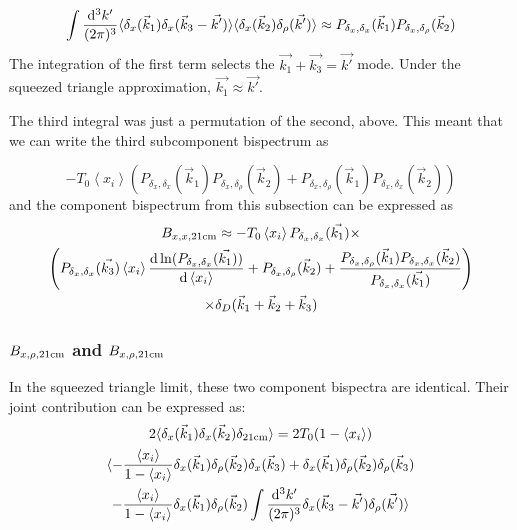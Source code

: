 \begin{equation}
\int \frac{{\rm d^3}k'}{(2\pi)^3} \langle \delta_x(\vec{k}_1)\delta_x(\vec{k}_3 - \vec{k'}) \rangle \langle \delta_x(\vec{k}_2) \delta_{\rho}(\vec{k'}) \rangle \approx P_{\delta_x, \delta_x}(\vec{k}_1) P_{\delta_x, \delta_{\rho}}(\vec{k}_2) 
\end{equation}
The integration of the first term selects the $\vec{k_1} + \vec{k_3} = \vec{k'}$ mode. Under the squeezed triangle approximation, $\vec{k_1} \approx \vec{k'}$.

The third integral was just a permutation of the second, above. This meant that we can write the third subcomponent bispectrum as

\begin{equation}
-T_0 \left\langle x_i \right\rangle \left(P_{\delta_x, \delta_x}(\vec{k}_1) P_{\delta_x, \delta_{\rho}}(\vec{k}_2)  + P_{\delta_x, \delta_{\rho}}(\vec{k}_1) P_{\delta_x, \delta_x}(\vec{k}_2)  \right)
\end{equation}
and the component bispectrum from this subsection can be expressed as
\begin{multline}
B_{x,x,{\rm 21cm}} \approx 
 - T_0 \left\langle x_i \right\rangle P_{\delta_x,\delta_x}(\vec{k_1}) \times \\
\left(
P_{\delta_x,\delta_x}(\vec{k_3}) \left\langle x_i \right\rangle \frac{{\rm d} \ln (P_{\delta_x,\delta_x}(\vec{k_1}))}{{\rm d}\left\langle x_i \right\rangle} 
+ P_{\delta_x, \delta_{\rho}}(\vec{k}_2)  +\frac{ P_{\delta_x, \delta_{\rho}}(\vec{k}_1)P_{\delta_x, \delta_x}(\vec{k}_2)}{P_{\delta_x,\delta_x}(\vec{k_1}) } 
\right) \\
\times \delta_D(\vec{k}_1+\vec{k}_2+\vec{k}_3)
\end{multline}

\subsubsection{$B_{x,\rho,{\rm 21cm}}$ and $B_{x,\rho,{\rm 21cm}}$}
\label{subsec:B_xrho21}

In the squeezed triangle limit, these two component bispectra are identical. Their joint contribution can be expressed as:
\begin{multline}
2\langle \delta_x(\vec{k}_1) \delta_x(\vec{k}_2) \delta_{{\rm 21cm}}\rangle = 
2T_0(1-\left\langle x_i \right\rangle) \\ \langle 
- \frac{\left\langle x_i \right\rangle}{1-\left\langle x_i \right\rangle} \delta_x(\vec{k}_1) \delta_{\rho}(\vec{k}_2) \delta_x(\vec{k}_3) 
+ \delta_x(\vec{k}_1) \delta_{\rho}(\vec{k}_2) \delta_{\rho}(\vec{k}_3) \\
- \frac{\left\langle x_i \right\rangle}{1-\left\langle x_i \right\rangle} \delta_x(\vec{k}_1) \delta_{\rho}(\vec{k}_2) \int \frac{{\rm d^3}k'}{(2\pi)^3} \delta_x(\vec{k}_3 - \vec{k'})\delta_{\rho}(\vec{k'})\rangle
\end{multline}

